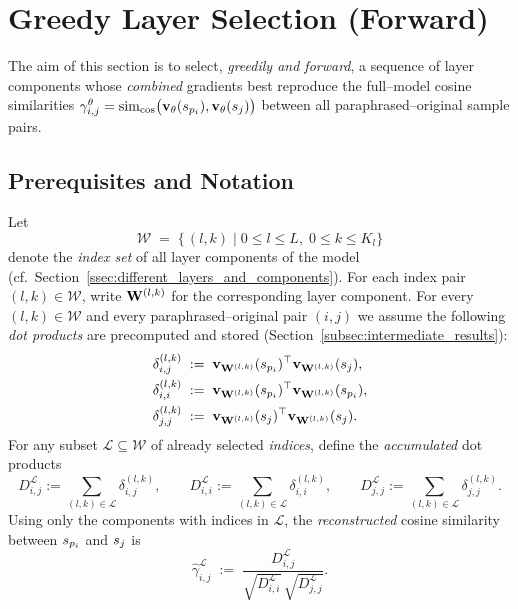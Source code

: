 \section{Greedy Layer Selection (Forward)}\label{sec:greedy_layer_selection}
The aim of this section is to select, \emph{greedily and forward}, a sequence of layer components whose \emph{combined} gradients best reproduce the full–model cosine similarities
$\gamma_{i,j}^{\theta} = \operatorname{sim}_{\cos}\bigl(\mathbf{v}_{\theta}(s_{p_i}),\mathbf{v}_{\theta}(s_j)\bigr)$ between all paraphrased–original sample pairs.

\subsection{Prerequisites and Notation}\label{ssec:gls_prereq}
Let
\[
\mathcal{W} \;=\; \bigl\{\, (l,k) \;\big|\; 0 \le l \le L,\; 0 \le k \le K_l \bigr\}
\]
denote the \emph{index set} of all layer components of the model (cf.\ Section~\ref{ssec:different_layers_and_components}).
For each index pair $(l,k)\in\mathcal{W}$, write $\mathbf{W}^{(l,k)}$ for the corresponding layer component. For every $(l,k) \in \mathcal{W}$ and every paraphrased–original pair $(i,j)$ we assume the following \emph{dot products} are precomputed and stored (Section~\ref{subsec:intermediate_results}):
\begin{equation}
\begin{split}
\delta^{(l,k)}_{i,j} \;&:=\; \vXspi[\Wlk]^{\top}\vXsj[\Wlk],\\
\delta^{(l,k)}_{i,i} \;&:=\; \vXspi[\Wlk]^{\top}\vXspi[\Wlk],\\
\delta^{(l,k)}_{j,j} \;&:=\; \vXsj[\Wlk]^{\top}\vXsj[\Wlk].
\end{split}
\label{eq:layer_dot_products_repeat}
\end{equation}
For any subset $\mathcal{L}\subseteq\mathcal{W}$ of already selected \emph{indices}, define the \emph{accumulated} dot products
\[
D^{\mathcal{L}}_{i,j} := \sum_{(l,k)\in\mathcal{L}}\delta^{(l,k)}_{i,j}, \qquad
D^{\mathcal{L}}_{i,i} := \sum_{(l,k)\in\mathcal{L}}\delta^{(l,k)}_{i,i}, \qquad
D^{\mathcal{L}}_{j,j} := \sum_{(l,k)\in\mathcal{L}}\delta^{(l,k)}_{j,j}.
\]
Using only the components with indices in $\mathcal{L}$, the \emph{reconstructed} cosine similarity between $s_{p_i}$ and $s_j$ is
\begin{equation}
\hat{\gamma}^{\mathcal{L}}_{i,j}
\;:=\;
\frac{D^{\mathcal{L}}_{i,j}}
     {\sqrt{D^{\mathcal{L}}_{i,i}}\,
      \sqrt{D^{\mathcal{L}}_{j,j}}}.
\label{eq:reconstructed_cosine}
\end{equation}
